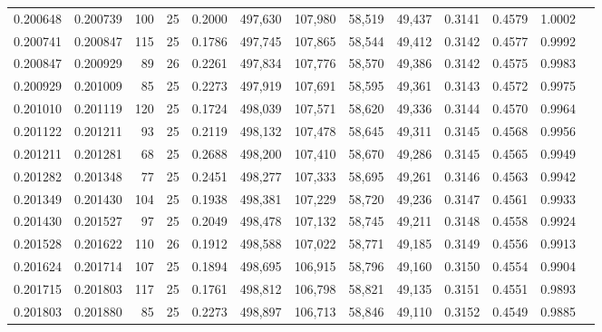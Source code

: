 \begin{tabular}{rrrrrrrrrrrrr}
0.200648 & 0.200739 &   100 &  25 &                                     0.2000 & 497,630 & 107,980 &  58,519 &  49,437 & 0.3141 & 0.4579 & 1.0002 \\
0.200741 & 0.200847 &   115 &  25 &                                     0.1786 & 497,745 & 107,865 &  58,544 &  49,412 & 0.3142 & 0.4577 & 0.9992 \\
0.200847 & 0.200929 &    89 &  26 &                                     0.2261 & 497,834 & 107,776 &  58,570 &  49,386 & 0.3142 & 0.4575 & 0.9983 \\
0.200929 & 0.201009 &    85 &  25 &                                     0.2273 & 497,919 & 107,691 &  58,595 &  49,361 & 0.3143 & 0.4572 & 0.9975 \\
0.201010 & 0.201119 &   120 &  25 &                                     0.1724 & 498,039 & 107,571 &  58,620 &  49,336 & 0.3144 & 0.4570 & 0.9964 \\
0.201122 & 0.201211 &    93 &  25 &                                     0.2119 & 498,132 & 107,478 &  58,645 &  49,311 & 0.3145 & 0.4568 & 0.9956 \\
0.201211 & 0.201281 &    68 &  25 &                                     0.2688 & 498,200 & 107,410 &  58,670 &  49,286 & 0.3145 & 0.4565 & 0.9949 \\
0.201282 & 0.201348 &    77 &  25 &                                     0.2451 & 498,277 & 107,333 &  58,695 &  49,261 & 0.3146 & 0.4563 & 0.9942 \\
0.201349 & 0.201430 &   104 &  25 &                                     0.1938 & 498,381 & 107,229 &  58,720 &  49,236 & 0.3147 & 0.4561 & 0.9933 \\
0.201430 & 0.201527 &    97 &  25 &                                     0.2049 & 498,478 & 107,132 &  58,745 &  49,211 & 0.3148 & 0.4558 & 0.9924 \\
0.201528 & 0.201622 &   110 &  26 &                                     0.1912 & 498,588 & 107,022 &  58,771 &  49,185 & 0.3149 & 0.4556 & 0.9913 \\
0.201624 & 0.201714 &   107 &  25 &                                     0.1894 & 498,695 & 106,915 &  58,796 &  49,160 & 0.3150 & 0.4554 & 0.9904 \\
0.201715 & 0.201803 &   117 &  25 &                                     0.1761 & 498,812 & 106,798 &  58,821 &  49,135 & 0.3151 & 0.4551 & 0.9893 \\
0.201803 & 0.201880 &    85 &  25 &                                     0.2273 & 498,897 & 106,713 &  58,846 &  49,110 & 0.3152 & 0.4549 & 0.9885 \\

\end{tabular}
